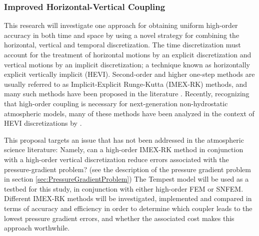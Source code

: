 \documentclass[11pt]{article}
\begin{document}

\subsubsection{Improved Horizontal-Vertical Coupling} \label{sec:CouplingSNFEM}

This research will investigate one approach for obtaining uniform high-order accuracy in both time and space by using a novel strategy for combining the horizontal, vertical and temporal discretization.  The time discretization must account for the treatment of horizontal motions by an explicit discretization and vertical motions by an implicit discretization; a technique known as horizontally explicit vertically implicit (HEVI).  Second-order and higher one-step methods are usually referred to as Implicit-Explicit Runge-Kutta (IMEX-RK) methods, and many such methods have been proposed in the literature \citep{UASJRRJS1997AMM, CACMHK2003ANM}.  Recently, recognizing that high-order coupling is necessary for next-generation non-hydrostatic atmospheric models, many of these methods have been analyzed in the context of HEVI discretizations by \cite{HWSJLNW2013JCP}.

This proposal targets an issue that has not been addressed in the atmospheric science literature:  Namely, can a high-order IMEX-RK method in conjunction with a high-order vertical discretization reduce errors associated with the pressure-gradient problem? (see the description of the pressure gradient problem in section \ref{sec:PressureGradientProblem})  The Tempest model will be used as a testbed for this study, in conjunction with either high-order FEM or SNFEM.  Different IMEX-RK methods will be investigated, implemented and compared in terms of accuracy and efficiency in order to determine which coupler leads to the lowest pressure gradient errors, and whether the associated cost makes this approach worthwhile.
\end{document}
